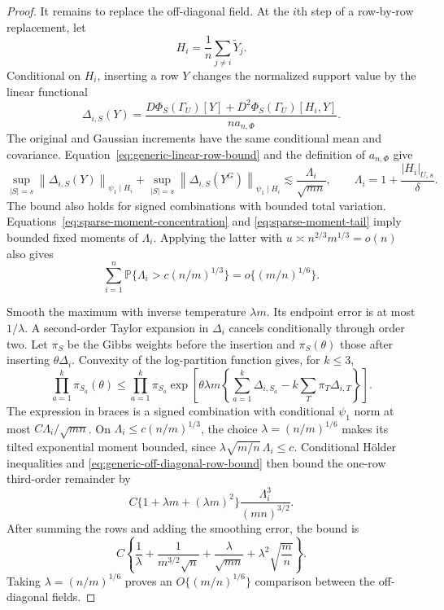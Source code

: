 \documentclass[a4paper,11pt,english]{article}
\newcommand{\Prob}{\mathbb P}
\newcommand{\norm}[1]{\left\lVert #1\right\rVert}
\begin{document}
\begin{proof}
It remains to replace the off-diagonal field.  At the $i$th step of a
row-by-row replacement, let
\[
        H_i=\frac1n\sum_{j\ne i}\widetilde Y_j.
\]
Conditional on $H_i$, inserting a row $Y$ changes the normalized
support value by the linear functional
\[
        \Delta_{i,S}(Y)
        =\frac{D\Phi_S(\Gamma_U)[Y]
        +D^2\Phi_S(\Gamma_U)[H_i,Y]}{na_{n,\Phi}}.
\]
The original and Gaussian increments have the same conditional mean and
covariance.  Equation~\eqref{eq:generic-linear-row-bound} and the
definition of $a_{n,\Phi}$ give
\begin{equation}\label{eq:generic-off-diagonal-row-bound}
        \sup_{|S|=s}\norm{\Delta_{i,S}(Y)}_{\psi_1\mid H_i}
        +\sup_{|S|=s}\norm{\Delta_{i,S}(Y^G)}_{\psi_1\mid H_i}
        \lesssim\frac{\Lambda_i}{\sqrt{mn}},
        \qquad
        \Lambda_i=1+\frac{|H_i|_{U,s}}{\delta}.
\end{equation}
The bound also holds for signed combinations with bounded total
variation.  Equations~\eqref{eq:sparse-moment-concentration} and
\eqref{eq:sparse-moment-tail} imply bounded fixed moments of
$\Lambda_i$.  Applying the latter with
$u\asymp n^{2/3}m^{1/3}=o(n)$ also gives
\[
        \sum_{i=1}^n\Prob\{\Lambda_i>c(n/m)^{1/3}\}
        =o\{(m/n)^{1/6}\}.
\]

Smooth the maximum with inverse temperature $\lambda m$.  Its endpoint
error is at most $1/\lambda$.  A second-order Taylor expansion in
$\Delta_i$ cancels conditionally through order two.  Let $\pi_S$ be the
Gibbs weights before the insertion and $\pi_S(\theta)$ those after
inserting $\theta\Delta_i$.  Convexity of the log-partition function gives,
for $k\le3$,
\[
 \prod_{a=1}^k\pi_{S_a}(\theta)
 \le \prod_{a=1}^k\pi_{S_a}
 \exp\!\left[\theta\lambda m\left\{
 \sum_{a=1}^k\Delta_{i,S_a}
 -k\sum_T\pi_T\Delta_{i,T}\right\}\right].
\]
The expression in braces is a signed combination with conditional
$\psi_1$ norm at most $C\Lambda_i/\sqrt{mn}$.  On
$\Lambda_i\le c(n/m)^{1/3}$, the choice
$\lambda=(n/m)^{1/6}$ makes its tilted exponential moment bounded, since
$\lambda\sqrt{m/n}\,\Lambda_i\le c$.  Conditional H\"older inequalities
and \eqref{eq:generic-off-diagonal-row-bound} then bound the one-row
third-order remainder by
\[
 C\{1+\lambda m+(\lambda m)^2\}
 \frac{\Lambda_i^3}{(mn)^{3/2}}.
\]
After summing the rows and adding the smoothing error, the bound is
\[
        C\left\{
        \frac1\lambda
        +\frac1{m^{3/2}\sqrt n}
        +\frac{\lambda}{\sqrt{mn}}
        +\lambda^2\sqrt{\frac mn}\right\}.
\]
Taking $\lambda=(n/m)^{1/6}$ proves an
$O\{(m/n)^{1/6}\}$ comparison between the off-diagonal fields.


\end{proof}
\end{document}
